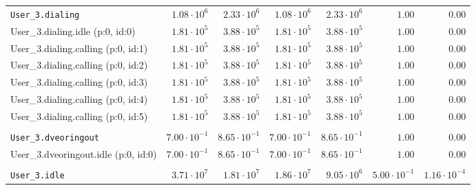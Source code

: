 \begin{table}[htbp]
{\begin{tabular}{lrrrrrr}
\\[-8pt]\texttt{User\_3.dialing}                      &  $1.08 \cdot 10^{6}$ &  $2.33 \cdot 10^{6}$ &  $1.08 \cdot 10^{6}$ &  $2.33 \cdot 10^{6}$ &               $1.00$ &               $0.00$ \\
\hspace{3mm}User\_3.dialing.idle (p:0, id:0)          &  $1.81 \cdot 10^{5}$ &  $3.88 \cdot 10^{5}$ &  $1.81 \cdot 10^{5}$ &  $3.88 \cdot 10^{5}$ &               $1.00$ &               $0.00$ \\
\hspace{3mm}User\_3.dialing.calling (p:0, id:1)       &  $1.81 \cdot 10^{5}$ &  $3.88 \cdot 10^{5}$ &  $1.81 \cdot 10^{5}$ &  $3.88 \cdot 10^{5}$ &               $1.00$ &               $0.00$ \\
\hspace{3mm}User\_3.dialing.calling (p:0, id:2)       &  $1.81 \cdot 10^{5}$ &  $3.88 \cdot 10^{5}$ &  $1.81 \cdot 10^{5}$ &  $3.88 \cdot 10^{5}$ &               $1.00$ &               $0.00$ \\
\hspace{3mm}User\_3.dialing.calling (p:0, id:3)       &  $1.81 \cdot 10^{5}$ &  $3.88 \cdot 10^{5}$ &  $1.81 \cdot 10^{5}$ &  $3.88 \cdot 10^{5}$ &               $1.00$ &               $0.00$ \\
\hspace{3mm}User\_3.dialing.calling (p:0, id:4)       &  $1.81 \cdot 10^{5}$ &  $3.88 \cdot 10^{5}$ &  $1.81 \cdot 10^{5}$ &  $3.88 \cdot 10^{5}$ &               $1.00$ &               $0.00$ \\
\hspace{3mm}User\_3.dialing.calling (p:0, id:5)       &  $1.81 \cdot 10^{5}$ &  $3.88 \cdot 10^{5}$ &  $1.81 \cdot 10^{5}$ &  $3.88 \cdot 10^{5}$ &               $1.00$ &               $0.00$ \\
\\[-8pt]\texttt{User\_3.dveoringout}                  & $7.00 \cdot 10^{-1}$ & $8.65 \cdot 10^{-1}$ & $7.00 \cdot 10^{-1}$ & $8.65 \cdot 10^{-1}$ &               $1.00$ &               $0.00$ \\
\hspace{3mm}User\_3.dveoringout.idle (p:0, id:0)      & $7.00 \cdot 10^{-1}$ & $8.65 \cdot 10^{-1}$ & $7.00 \cdot 10^{-1}$ & $8.65 \cdot 10^{-1}$ &               $1.00$ &               $0.00$ \\
\\[-8pt]\texttt{User\_3.idle}                         &  $3.71 \cdot 10^{7}$ &  $1.81 \cdot 10^{7}$ &  $1.86 \cdot 10^{7}$ &  $9.05 \cdot 10^{6}$ & $5.00 \cdot 10^{-1}$ & $1.16 \cdot 10^{-4}$ \\

\end{tabular}}
\end{table}

